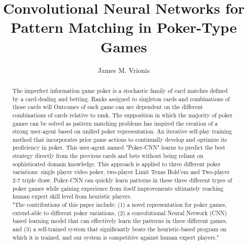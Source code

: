 \documentclass[review]{elsarticle}
\begin{document}
\begin{frontmatter}
\title{Convolutional Neural Networks for Pattern Matching in Poker-Type Games}


\author{James M. Vrionis }
\address{Santa Cruz, California}






\begin{abstract} 
The imperfect information game poker is a stochastic family of card 
matches defined by a card-dealing and betting. Ranks assigned to 
singleton cards and combinations of those cards will Outcomes of each 
game can are dependent on the different combinations of cards relative 
to rank. The supposition in which the majority of poker games can be 
solved as pattern matching problems has inspired the creation of a 
strong user-agent based on unified poker representation. An iterative 
self-play training method that incorporates prior game actions to 
continually develop and optimize its proficiency in poker. This 
user-agent named {\ttfamily"}Poker-CNN{\ttfamily"} learns to predict 
the best strategy directly from the previous cards and bets without 
being reliant on sophisticated domain knowledge. This approach is 
applied to three different poker variations: single player video poker, 
two-player Limit Texas Hold'em and Two-player 2-7 triple draw. Poker-CNN 
can quickly learn patterns in these three different types of poker 
games while gaining experience from itself improvements 
ultimately reaching human expert skill level from heuristic players.\\ 
{\ttfamily"}The contributions of this paper include: (1) a novel 
representation for poker games, extend-able to different poker 
variations, (2) a convolutional Neural Network (CNN) based learning 
model that can effectively learn the patterns in three different games, 
and (3) a self-trained system that significantly beats the heuristic-based 
program on which it is trained, and our system is competitive against 
human expert players.{\ttfamily"}
\end{abstract}


\end{frontmatter}
\end{document}
